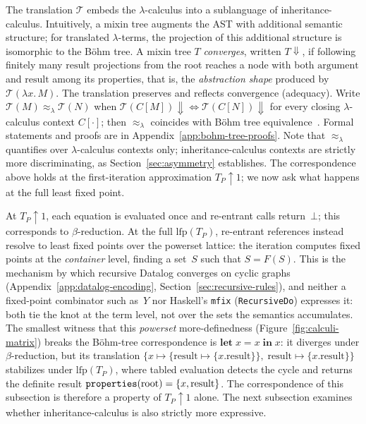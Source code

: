 The translation $\mathcal{T}$ embeds the $\lambda$-calculus
into a sublanguage of inheritance-calculus.
Intuitively, a mixin tree augments the AST with
additional semantic structure; for translated
$\lambda$-terms, the projection of this additional
structure is isomorphic to the B\"ohm tree.
A mixin tree $T$ \emph{converges}, written $T{\Downarrow}$,
if following finitely many $\mathrm{result}$ projections from
the root reaches a node with both $\mathrm{argument}$ and
$\mathrm{result}$ among its properties, that is, the \emph{abstraction shape}
produced by $\mathcal{T}(\lambda x.\, M)$.
The translation preserves and reflects convergence
(adequacy).
Write $\mathcal{T}(M) \approx_\lambda \mathcal{T}(N)$
when $\mathcal{T}(C[M]){\Downarrow} \Leftrightarrow
\mathcal{T}(C[N]){\Downarrow}$ for every closing
$\lambda$-calculus context $C[\cdot]$;
then $\approx_\lambda$ coincides with B\"ohm tree
equivalence~\cite{barendregt1984-lambda-calculus}.
Formal statements and proofs are in
Appendix~\ref{app:bohm-tree-proofs}.
Note that $\approx_\lambda$ quantifies over $\lambda$-calculus
contexts only; inheritance-calculus contexts are strictly more
discriminating, as Section~\ref{sec:asymmetry} establishes.
The correspondence above holds at the first-iteration
approximation $T_P\!\uparrow\!1$; we now ask what happens
at the full least fixed point.

At $T_P\!\uparrow\!1$, each equation is evaluated once and
re-entrant calls return~$\bot$; this corresponds to
$\beta$-reduction.
At the full $\mathrm{lfp}(T_P)$, re-entrant references instead
resolve to least fixed points over the powerset lattice: the
iteration computes fixed points at the \emph{container} level,
finding a set~$S$ such that $S = F(S)$.
This is the mechanism by which recursive Datalog converges on
cyclic graphs (Appendix~\ref{app:datalog-encoding},
Section~\ref{sec:recursive-rules}), and neither a fixed-point
combinator such as~$Y$ nor Haskell's \texttt{mfix}
(\texttt{RecursiveDo}) expresses it: both tie the knot at the
term level, not over the sets the semantics accumulates.
The smallest witness that this \emph{powerset} more-definedness
(Figure~\ref{fig:calculi-matrix}) breaks the B\"ohm-tree
correspondence is
$\mathbf{let}\; x = x \;\mathbf{in}\; x$:
it diverges under $\beta$-reduction, but its translation
$\{x \mapsto \{\mathrm{result} \mapsto \{x.\mathrm{result}\}\},\;
\mathrm{result} \mapsto \{x.\mathrm{result}\}\}$
stabilizes under $\mathrm{lfp}(T_P)$, where tabled evaluation
detects the cycle and returns the definite result
$\mathtt{properties}(\mathrm{root}) = \{x, \mathrm{result}\}$.
The correspondence of this subsection is therefore a property
of $T_P\!\uparrow\!1$ alone.
The next subsection examines whether inheritance-calculus is
also strictly more expressive.

